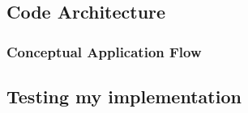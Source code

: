\subsection{Code Architecture}

\subsubsection{Conceptual Application Flow}


\subsection{Testing my implementation}
